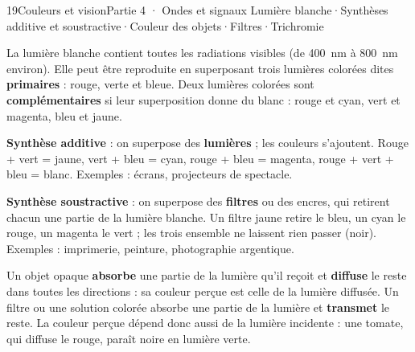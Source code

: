 \begin{ouverture}[spectre]{19}{Couleurs et vision}{Partie 4 · Ondes et signaux}
{Lumière blanche\enspace·\enspace Synthèses additive et soustractive\enspace·\enspace Couleur des objets\enspace·\enspace Filtres\enspace·\enspace Trichromie}
\end{ouverture}
\essentiel
{}
\begin{definition}
La lumière blanche contient toutes les radiations visibles (de \qty{400}{nm} à \qty{800}{nm} environ). Elle peut être reproduite en superposant
trois lumières colorées dites \textbf{primaires} : rouge, verte et bleue. Deux lumières colorées sont \textbf{complémentaires} si leur
superposition donne du blanc : rouge et cyan, vert et magenta, bleu et jaune.
\end{definition}
\begin{propriete}
\textbf{Synthèse additive} : on superpose des \textbf{lumières} ; les couleurs s'ajoutent. Rouge + vert = jaune, vert + bleu = cyan, rouge + bleu =
magenta, rouge + vert + bleu = blanc. Exemples : écrans, projecteurs de spectacle.\par
\textbf{Synthèse soustractive} : on superpose des \textbf{filtres} ou des encres, qui retirent chacun une partie de la lumière blanche. Un filtre jaune
retire le bleu, un cyan le rouge, un magenta le vert ; les trois ensemble ne laissent rien passer (noir). Exemples : imprimerie,
peinture, photographie argentique.
\end{propriete}
\begin{loi}
Un objet opaque \textbf{absorbe} une partie de la lumière qu'il reçoit et \textbf{diffuse} le reste dans toutes les directions : sa couleur perçue est
celle de la lumière diffusée. Un filtre ou une solution colorée absorbe une partie de la lumière et \textbf{transmet} le reste. La couleur
perçue dépend donc aussi de la lumière incidente : une tomate, qui diffuse le rouge, paraît noire en lumière verte.
\end{loi}
